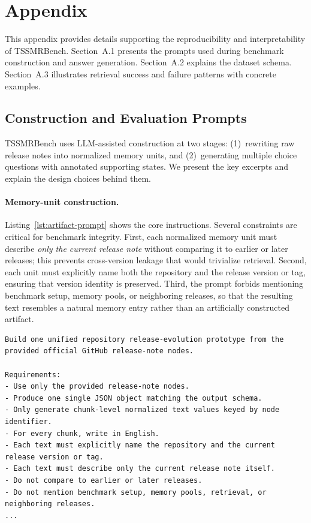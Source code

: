 \section{Appendix}

This appendix provides details supporting the reproducibility and interpretability of TSSMRBench. Section~A.1 presents the prompts used during benchmark construction and answer generation. Section~A.2 explains the dataset schema. Section~A.3 illustrates retrieval success and failure patterns with concrete examples.

\subsection{Construction and Evaluation Prompts}

TSSMRBench uses LLM-assisted construction at two stages: (1)~rewriting raw release notes into normalized memory units, and (2)~generating multiple choice questions with annotated supporting states. We present the key excerpts and explain the design choices behind them.

\paragraph{Memory-unit construction.}
Listing~\ref{lst:artifact-prompt} shows the core instructions. Several constraints are critical for benchmark integrity. First, each normalized memory unit must describe \emph{only the current release note} without comparing it to earlier or later releases; this prevents cross-version leakage that would trivialize retrieval. Second, each unit must explicitly name both the repository and the release version or tag, ensuring that version identity is preserved. Third, the prompt forbids mentioning benchmark setup, memory pools, or neighboring releases, so that the resulting text resembles a natural memory entry rather than an artificially constructed artifact.

\begin{lstlisting}[caption={Excerpt from the release-window construction prompt.},label={lst:artifact-prompt}]
Build one unified repository release-evolution prototype from the provided official GitHub release-note nodes.

Requirements:
- Use only the provided release-note nodes.
- Produce one single JSON object matching the output schema.
- Only generate chunk-level normalized text values keyed by node identifier.
- For every chunk, write in English.
- Each text must explicitly name the repository and the current release version or tag.
- Each text must describe only the current release note itself.
- Do not compare to earlier or later releases.
- Do not mention benchmark setup, memory pools, retrieval, or neighboring releases.
...
\end{lstlisting}

